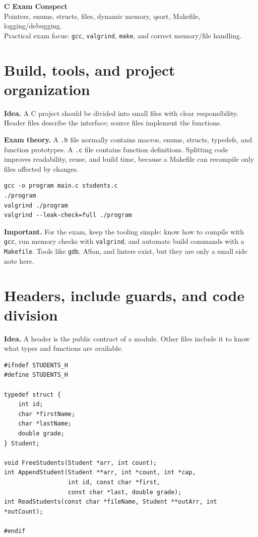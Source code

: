 \documentclass[10pt,a4paper]{article}
\newcommand{\idea}{\noindent\textbf{\textcolor{accentdark}{Idea.}} }
\newcommand{\theory}{\noindent\textbf{\textcolor{accentdark}{Exam theory.}} }
\newcommand{\important}[1]{\par\smallskip\noindent\colorbox{softyellow}{\parbox{\dimexpr\linewidth-2\fboxsep}{\textbf{\textcolor{accentdark}{Important.}} #1}}\par\smallskip}
\begin{document}
\begin{center}
{\Large \textbf{C Exam Conspect}}\\[-0.1em]
{\small Pointers, enums, structs, files, dynamic memory, qsort, Makefile, logging/debugging.}\\[-0.1em]
{\small Practical exam focus: \texttt{gcc}, \texttt{valgrind}, \texttt{make}, and correct memory/file handling.}
\end{center}
\vspace{-0.6em}
\tableofcontents
\vspace{0.2em}

\section{Build, tools, and project organization}
\idea A C project should be divided into small files with clear responsibility. Header files describe the interface; source files implement the functions.

\theory A \texttt{.h} file normally contains macros, enums, structs, typedefs, and function prototypes. A \texttt{.c} file contains function definitions. Splitting code improves readability, reuse, and build time, because a Makefile can recompile only files affected by changes.

\begin{lstlisting}[caption={Minimal compile, run, and Valgrind usage}]
gcc -o program main.c students.c
./program
valgrind ./program
valgrind --leak-check=full ./program
\end{lstlisting}

\important{For the exam, keep the tooling simple: know how to compile with \texttt{gcc}, run memory checks with \texttt{valgrind}, and automate build commands with a \texttt{Makefile}. Tools like \texttt{gdb}, ASan, and linters exist, but they are only a small side note here.}

\section{Headers, include guards, and code division}
\idea A header is the public contract of a module. Other files include it to know what types and functions are available.

\begin{lstlisting}[caption={students.h}]
#ifndef STUDENTS_H
#define STUDENTS_H

typedef struct {
    int id;
    char *firstName;
    char *lastName;
    double grade;
} Student;

void FreeStudents(Student *arr, int count);
int AppendStudent(Student **arr, int *count, int *cap,
                  int id, const char *first,
                  const char *last, double grade);
int ReadStudents(const char *fileName, Student **outArr, int *outCount);

#endif
\end{lstlisting}
\end{document}
